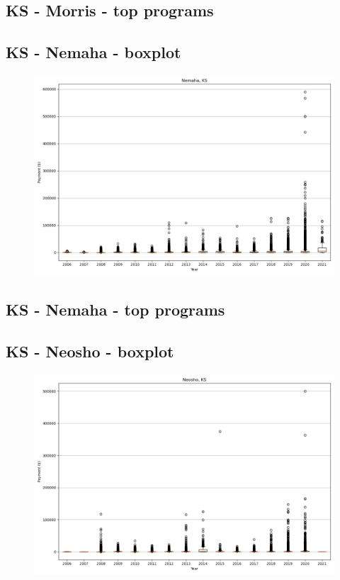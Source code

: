 \subsection*{KS - Morris - top programs}

\newpage
\subsection*{KS - Nemaha - boxplot}
\begin{figure}[h]
\centering
\includegraphics[width=7in]{../output/boxplots/counties/Nemaha-KS_boxplot.png}
\end{figure}


\subsection*{KS - Nemaha - top programs}

\newpage
\subsection*{KS - Neosho - boxplot}
\begin{figure}[h]
\centering
\includegraphics[width=7in]{../output/boxplots/counties/Neosho-KS_boxplot.png}
\end{figure}


